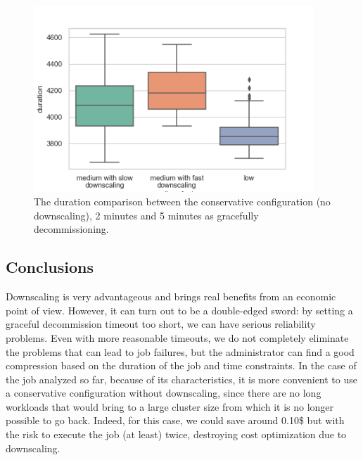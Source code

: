 \documentclass[12pt,twoside,cucitura]{toptesi}
\begin{document}
\begin{figure}
\centering
\includegraphics[height=70mm]{slow-down-duration}
\caption{The duration comparison between the conservative configuration (no downscaling), 2 minutes and 5 minutes as gracefully decommissioning.}\label{fig:slow-down-duration}
\end{figure}

\subsection{Conclusions}
Downscaling is very advantageous and brings real benefits from an economic point of view. However, it can turn out to be a double-edged sword: by setting a graceful decommission timeout too short, we can have serious reliability problems. Even with more reasonable timeouts, we do not completely eliminate the problems that can lead to job failures, but the administrator can find a good compression based on the duration of the job and time constraints. In the case of the job analyzed so far, because of its characteristics, it is more convenient to use a conservative configuration without downscaling, since there are no long workloads that would bring to a large cluster size from which it is no longer possible to go back. Indeed, for this case, we could save around 0.10\$ but with the risk to execute the job (at least) twice, destroying cost optimization due to downscaling.
\end{document}
